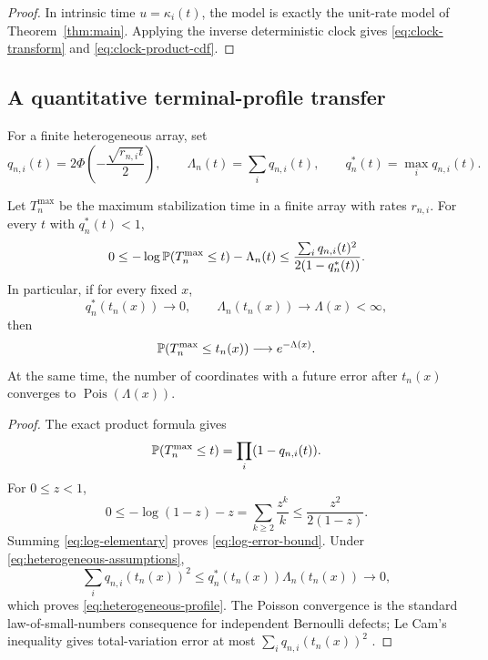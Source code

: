 \begin{proof}
In intrinsic time $u=\kappa_i(t)$, the model is exactly the unit-rate model of
Theorem~\ref{thm:main}.  Applying the inverse deterministic clock gives
\eqref{eq:clock-transform} and \eqref{eq:clock-product-cdf}.
\end{proof}

\subsection{A quantitative terminal-profile transfer}

For a finite heterogeneous array, set
\begin{equation}\label{eq:heterogeneous-q}
  q_{n,i}(t)=2\Phi\!\left(-\frac{\sqrt{r_{n,i}t}}2\right),
  \qquad
  \Lambda_n(t)=\sum_iq_{n,i}(t),
  \qquad
  q_n^*(t)=\max_iq_{n,i}(t).
\end{equation}

\begin{proposition}\label{prop:poisson-transfer}
Let $T_n^{\max}$ be the maximum stabilization time in a finite array with rates
$r_{n,i}$.  For every $t$ with $q_n^*(t)<1$,
\begin{equation}\label{eq:log-error-bound}
  0\le
  -\log\P(T_n^{\max}\le t)-\Lambda_n(t)
  \le
  \frac{\sum_iq_{n,i}(t)^2}{2(1-q_n^*(t))}.
\end{equation}
In particular, if for every fixed $x$,
\begin{equation}\label{eq:heterogeneous-assumptions}
  q_n^*(t_n(x))\to0,
  \qquad
  \Lambda_n(t_n(x))\to\Lambda(x)<\infty,
\end{equation}
then
\begin{equation}\label{eq:heterogeneous-profile}
  \P(T_n^{\max}\le t_n(x))\longrightarrow e^{-\Lambda(x)}.
\end{equation}
At the same time, the number of coordinates with a future error after
$t_n(x)$ converges to $\operatorname{Pois}(\Lambda(x))$.
\end{proposition}

\begin{proof}
The exact product formula gives
\[
  \P(T_n^{\max}\le t)=\prod_i(1-q_{n,i}(t)).
\]
For $0\le z<1$,
\begin{equation}\label{eq:log-elementary}
  0\le-\log(1-z)-z
  =\sum_{k\ge2}\frac{z^k}{k}
  \le\frac{z^2}{2(1-z)}.
\end{equation}
Summing \eqref{eq:log-elementary} proves \eqref{eq:log-error-bound}.  Under
\eqref{eq:heterogeneous-assumptions},
\[
  \sum_iq_{n,i}(t_n(x))^2
  \le q_n^*(t_n(x))\Lambda_n(t_n(x))\to0,
\]
which proves \eqref{eq:heterogeneous-profile}.  The Poisson convergence is the
standard law-of-small-numbers consequence for independent Bernoulli defects;
Le Cam's inequality gives total-variation error at most
$\sum_i q_{n,i}(t_n(x))^2$ \cite{LeCam1960}.
\end{proof}
